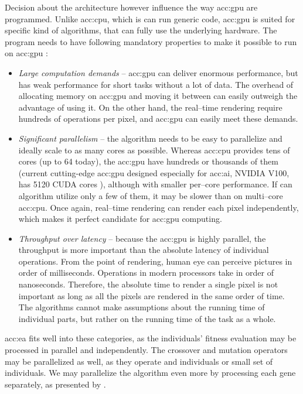 Decision about the architecture however influence the way \acrshort{acc:gpu} are programmed. Unlike \acrshort{acc:cpu}, which is can run generic code, \acrshort{acc:gpu} is suited for specific kind of algorithms, that can fully use the underlying hardware. The program needs to have following mandatory properties to make it possible to run on \acrshort{acc:gpu} \citep{GPUComputingOwens}:
\begin{itemize}
    \item \textit{Large computation demands} -- \acrshort{acc:gpu} can deliver enormous performance, but has weak performance for short tasks without a lot of data. The overhead of allocating memory on \acrshort{acc:gpu} and moving it between can easily outweigh the advantage of using it. On the other hand, the real--time rendering require hundreds of operations per pixel, and \acrshort{acc:gpu} can easily meet these demands.
    \item \textit{Significant parallelism} -- the algorithm needs to be easy to parallelize and ideally scale to as many cores as possible. Whereas \acrshort{acc:cpu} provides tens of cores (up to 64 today), the \acrshort{acc:gpu} have hundreds or thousands of them (current cutting-edge \acrshort{acc:gpu} designed especially for \acrshort{acc:ai}, NVIDIA V100, has 5120 CUDA cores \citep{nvidiav100spec}), although with smaller per--core performance. If can algorithm utilize only a few of them, it may be slower than on multi--core \acrshort{acc:cpu}. Once again, real--time rendering can render each pixel independently, which makes it perfect candidate for \acrshort{acc:gpu} computing.
    \item \textit{Throughput over latency} -- because the \acrshort{acc:gpu} is highly parallel, the throughput is more important than the absolute latency of individual operations. From the point of rendering, human eye can perceive pictures in order of milliseconds. Operations in modern processors take in order of nanoseconds. Therefore, the absolute time to render a single pixel is not important as long as all the pixels are rendered in the same order of time. The algorithms cannot make assumptions about the running time of individual parts, but rather on the running time of the task as a whole.
\end{itemize}

\acrlong{acc:ea} fits well into these categories, as the individuals' fitness evaluation may be processed in parallel and independently. The crossover and mutation operators may be parallelized as well, as they operate and individuals or small set of individuals. We may parallelize the algorithm even more by processing each gene separately, as presented by \citet{CHENG2019514}.


